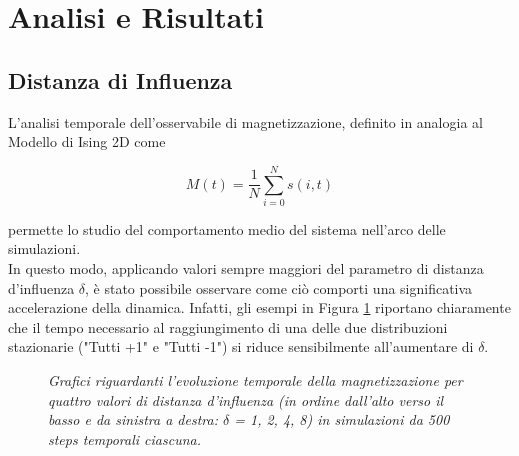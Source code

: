 \documentclass{article}
\begin{document}


\section{Analisi e Risultati}
\label{Sec:4}

\subsection{Distanza di Influenza}
\label{Sec:4.1}

L'analisi temporale dell'osservabile di magnetizzazione, definito in analogia al Modello di Ising 2D come

\begin{equation}
M(t) = \dfrac{1}{N} \sum_{i = 0}^{N} s(i,t)
\end{equation}

permette lo studio del comportamento medio del sistema nell'arco delle simulazioni.
\\ In questo modo, applicando valori sempre maggiori del parametro di distanza d'influenza $\delta$, è stato possibile osservare come ciò comporti una significativa accelerazione della dinamica. Infatti, gli esempi in Figura \ref{Fig:9} riportano chiaramente che il tempo necessario al raggiungimento di una delle due distribuzioni stazionarie ("Tutti +1" e "Tutti -1") si riduce sensibilmente all'aumentare di $\delta$.

\begin{figure}[h]
{\centering\par
{}
\par}
\caption{\textit{Grafici riguardanti l'evoluzione temporale della magnetizzazione per quattro valori di distanza d'influenza (in ordine dall'alto verso il basso e da sinistra a destra: $\delta$ = 1, 2, 4, 8) in simulazioni da 500 steps temporali ciascuna.}}
\label{Fig:9}
\end{figure}
\end{document}
